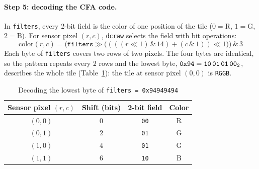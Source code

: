 \documentclass[a4paper]{article}
\begin{document}
\paragraph{Step 5: decoding the CFA code.} In \texttt{filters}, every 2-bit field is the color of one position of the tile ($0 = \text{R}$, $1 = \text{G}$, $2 = \text{B}$). For sensor pixel $(r, c)$, \texttt{dcraw} selects the field with bit operations:
\begin{equation}
    \text{color}(r, c) = \big(\texttt{filters} \gg \big((((r \ll 1) \,\&\, 14) + (c \,\&\, 1)) \ll 1\big)\big) \,\&\, 3
\end{equation}
Each byte of \texttt{filters} covers two rows of two pixels. The four bytes are identical, so the pattern repeats every 2 rows and the lowest byte, $\texttt{0x94} = \texttt{10\,01\,01\,00}_2$, describes the whole tile (Table~\ref{tab:filters}): the tile at sensor pixel $(0, 0)$ is \texttt{RGGB}.

\begin{table}[H]
\centering
\caption{Decoding the lowest byte of \texttt{filters = 0x94949494}}
\label{tab:filters}
\begin{tabular}{cccc}
\toprule
\textbf{Sensor pixel $(r, c)$} & \textbf{Shift (bits)} & \textbf{2-bit field} & \textbf{Color} \\
\midrule
$(0, 0)$ & $0$ & \texttt{00} & R \\
$(0, 1)$ & $2$ & \texttt{01} & G \\
$(1, 0)$ & $4$ & \texttt{01} & G \\
$(1, 1)$ & $6$ & \texttt{10} & B \\
\bottomrule
\end{tabular}
\end{table}
\end{document}
